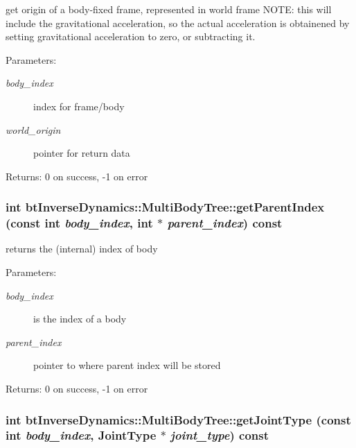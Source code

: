 get origin of a body-fixed frame, represented in world frame NOTE: this will include the gravitational acceleration, so the actual acceleration is obtainened by setting gravitational acceleration to zero, or subtracting it. \begin{Desc}
\item[Parameters:]
\begin{description}
\item[{\em body\_\-index}]index for frame/body \item[{\em world\_\-origin}]pointer for return data \end{description}
\end{Desc}
\begin{Desc}
\item[Returns:]0 on success, -1 on error \end{Desc}
\hypertarget{classbt_inverse_dynamics_1_1_multi_body_tree_fc4f7fc8066ceaa8f666fbad2fcbd33d}{
\subsubsection[getParentIndex]{\setlength{\rightskip}{0pt plus 5cm}int btInverseDynamics::MultiBodyTree::getParentIndex (const int {\em body\_\-index}, \/  int $\ast$ {\em parent\_\-index}) const}}
\label{classbt_inverse_dynamics_1_1_multi_body_tree_fc4f7fc8066ceaa8f666fbad2fcbd33d}


returns the (internal) index of body \begin{Desc}
\item[Parameters:]
\begin{description}
\item[{\em body\_\-index}]is the index of a body \item[{\em parent\_\-index}]pointer to where parent index will be stored \end{description}
\end{Desc}
\begin{Desc}
\item[Returns:]0 on success, -1 on error \end{Desc}
\hypertarget{classbt_inverse_dynamics_1_1_multi_body_tree_364bd17e226b15ab6615de4bf8de110d}{
\subsubsection[getJointType]{\setlength{\rightskip}{0pt plus 5cm}int btInverseDynamics::MultiBodyTree::getJointType (const int {\em body\_\-index}, \/  JointType $\ast$ {\em joint\_\-type}) const}}
\label{classbt_inverse_dynamics_1_1_multi_body_tree_364bd17e226b15ab6615de4bf8de110d}


